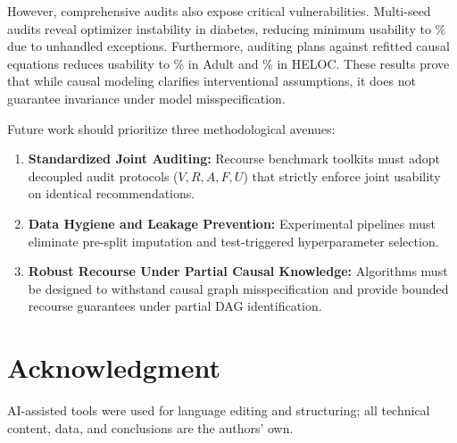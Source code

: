 \documentclass[nolineno]{paper/ieee-access/ieeeaccess}%
\begin{document}
However, comprehensive audits also expose critical vulnerabilities. Multi-seed audits reveal optimizer instability in diabetes, reducing minimum usability to \DiabetesCacSeedMin\% due to \DiabetesCacSeedFailures{} unhandled exceptions. Furthermore, auditing plans against refitted causal equations reduces usability to \AdultRefitUsable\% in Adult and \HelocRefitUsable\% in HELOC. These results prove that while causal modeling clarifies interventional assumptions, it does not guarantee invariance under model misspecification.

Future work should prioritize three methodological avenues:
\begin{enumerate}
\item \textbf{Standardized Joint Auditing:} Recourse benchmark toolkits must adopt decoupled audit protocols ($V, R, A, F, U$) that strictly enforce joint usability on identical recommendations.
\item \textbf{Data Hygiene and Leakage Prevention:} Experimental pipelines must eliminate pre-split imputation and test-triggered hyperparameter selection.
\item \textbf{Robust Recourse Under Partial Causal Knowledge:} Algorithms must be designed to withstand causal graph misspecification and provide bounded recourse guarantees under partial DAG identification.
\end{enumerate}

\section*{Acknowledgment}
AI-assisted tools were used for language editing and structuring; all technical content, data, and conclusions are the authors' own.
\end{document}
